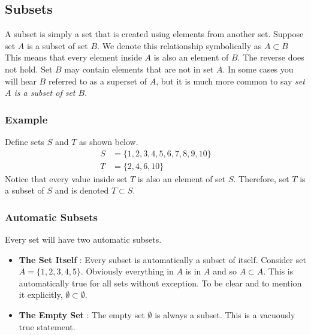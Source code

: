\subsection*{Subsets}
A subset is simply a set that is created using elements from another set.  Suppose set $A$ is a subset of set $B$.  We denote this relationship  symbolically as $A \subset B$
This means that every element inside $A$ is also an element of $B$.  The reverse does not hold.  Set $B$ may contain elements that are not in set $A$.  In some cases you will hear $B$ referred to as a superset of $A$, but it is much more common to say \emph{set $A$ is a subset of set $B$}.
\subsubsection*{Example}
Define sets $S$ and $T$ as shown below.
\begin{align*}
    S &= \{1,2,3,4,5,6,7,8,9,10\}\\
    T &= \{2,4,6,10\}
\end{align*}
Notice that every value inside set $T$ is also an element of set $S$.  Therefore, set $T$ is a subset of $S$ and is denoted $T \subset S$.
\subsubsection*{Automatic Subsets}
Every set will have two automatic subsets.
\begin{itemize}
    \item \textbf{The Set Itself} : Every subset is automatically a subset of itself.  Consider set $A = \{1,2,3,4,5\}$.  Obviously everything in $A$ is in $A$ and so $A \subset A$.  This is automatically true for all sets without exception.  To be clear and to mention it explicitly, $\emptyset \subset \emptyset$.
    \item \textbf{The Empty Set} : The empty set $\emptyset$ is always a subset.   This is a vacuously true statement.
\end{itemize}

